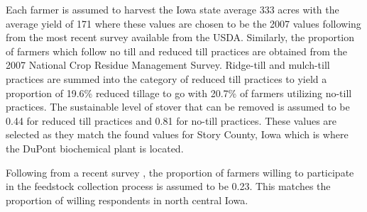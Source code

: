 \documentclass{article}\usepackage[]{graphicx}\usepackage[]{color}
\begin{document}
Each farmer is assumed to harvest the Iowa state average 333 acres with the average yield of 171 where these values are chosen to be the 2007 values following from the most recent survey available from the USDA.  Similarly, the proportion of farmers which follow no till and reduced till practices are obtained from the 2007 National Crop Residue Management Survey.  Ridge-till and mulch-till practices are summed into the category of reduced till practices to yield a proportion of 19.6\% reduced tillage to go with 20.7\% of farmers utilizing no-till practices.  The sustainable level of stover that can be removed is assumed to be 0.44 for reduced till practices and 0.81 for no-till practices.  These values are selected as they match the found values for Story County, Iowa which is where the DuPont biochemical plant is located.

Following from a recent survey \cite{Tyndall}, the proportion of farmers willing to participate in the feedstock collection process is assumed to be 0.23.  This matches the proportion of willing respondents in north central Iowa.
\end{document}
